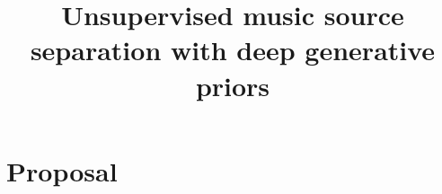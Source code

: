 \documentclass[a4paper,11pt]{book}
\title{Unsupervised music source separation with deep generative priors}
\begin{document}
\frontmatter%
\maketitle

\tableofcontents

\mainmatter%
\chapter{Proposal}






\backmatter%

\printbibliography%
\end{document}

